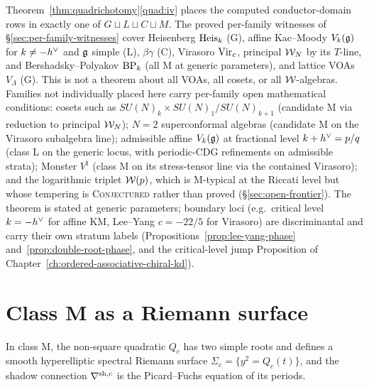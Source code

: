 \begin{remark}
\label{rem:quadrichotomy-completeness-scope}
Theorem~\ref{thm:quadrichotomy}\ref{quad:iv} places the computed
conductor-domain rows in exactly one of
$G \sqcup L \sqcup C \sqcup M$. The proved per-family witnesses of
\S\ref{sec:per-family-witnesses} cover Heisenberg $\mathrm{Heis}_k$ (G),
affine Kac--Moody $V_k(\mathfrak{g})$ for $k \ne -h^{\vee}$ and $\mathfrak{g}$ simple (L),
$\beta\gamma$ (C), Virasoro $\mathrm{Vir}_c$, principal $\mathcal{W}_N$ by its
$T$-line, and Bershadsky--Polyakov $\mathrm{BP}_k$ (all M at generic
parameters), and lattice VOAs $V_\Lambda$ (G). This is not a theorem
about all VOAs, all cosets, or all $\mathcal{W}$-algebras. Families not
individually placed here carry per-family open mathematical conditions: cosets such as
$SU(N)_k \times SU(N)_1 / SU(N)_{k+1}$ (candidate M via reduction to
principal $\mathcal{W}_N$); $N = 2$ superconformal algebras (candidate M on the
Virasoro subalgebra line); admissible
affine $V_k(\mathfrak{g})$ at fractional level $k + h^{\vee} = p/q$ (class L on
the generic locus, with periodic-CDG refinements on admissible
strata); Monster $V^\natural$ (class M on its stress-tensor line via
the contained Virasoro); and the logarithmic triplet $\mathcal{W}(p)$, which
is M-typical at the Riccati level but whose tempering is
\textsc{Conjectured} rather than proved (\S\ref{sec:open-frontier}).
The theorem is stated at generic parameters; boundary loci (e.g.\
critical level
$k = -h^{\vee}$ for affine KM, Lee--Yang $c = -22/5$ for Virasoro) are
discriminantal and carry their own stratum labels
(Propositions~\ref{prop:lee-yang-phase}
and~\ref{prop:double-root-phase}, and the critical-level jump
Proposition of Chapter~\ref{ch:ordered-associative-chiral-kd}).
\end{remark}

\section{Class M as a Riemann surface}
\label{sec:class-M-Riemann-surface}

In class M, the non-square quadratic $Q_c$ has two simple roots and
defines a smooth
hyperelliptic spectral Riemann surface
$\Sigma_c = \{y^{2} = Q_c(t)\}$, and the shadow connection
$\nabla^{\rm sh, c}$ is the Picard--Fuchs equation of its periods.

